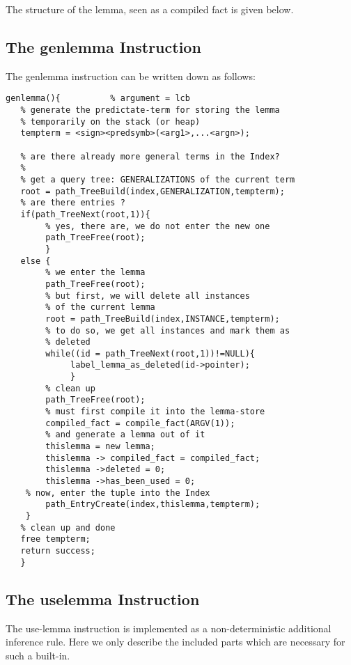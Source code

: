 The structure of the lemma, seen as a compiled fact is given below.
	
\subsection{The genlemma Instruction}

The genlemma instruction can be written down as follows:

\begin{verbatim}
genlemma(){          % argument = lcb
   % generate the predictate-term for storing the lemma
   % temporarily on the stack (or heap)
   tempterm = <sign><predsymb>(<arg1>,...<argn>);

   % are there already more general terms in the Index?
   %
   % get a query tree: GENERALIZATIONS of the current term 
   root = path_TreeBuild(index,GENERALIZATION,tempterm);
   % are there entries ?
   if(path_TreeNext(root,1)){
        % yes, there are, we do not enter the new one
        path_TreeFree(root);
        }
   else {
        % we enter the lemma
        path_TreeFree(root);
        % but first, we will delete all instances
        % of the current lemma
        root = path_TreeBuild(index,INSTANCE,tempterm);
        % to do so, we get all instances and mark them as
        % deleted
        while((id = path_TreeNext(root,1))!=NULL){
             label_lemma_as_deleted(id->pointer);
             }
        % clean up
        path_TreeFree(root);
        % must first compile it into the lemma-store
        compiled_fact = compile_fact(ARGV(1));
        % and generate a lemma out of it
        thislemma = new lemma;
        thislemma -> compiled_fact = compiled_fact;
        thislemma ->deleted = 0;
        thislemma ->has_been_used = 0;
	% now, enter the tuple into the Index
        path_EntryCreate(index,thislemma,tempterm);
	}
   % clean up and done
   free tempterm;
   return success;
   }
\end{verbatim}
    
\subsection{The uselemma Instruction}

The use-lemma instruction is implemented
as a non-deterministic additional inference rule. Here we only
describe the included parts which are necessary for such a built-in.

